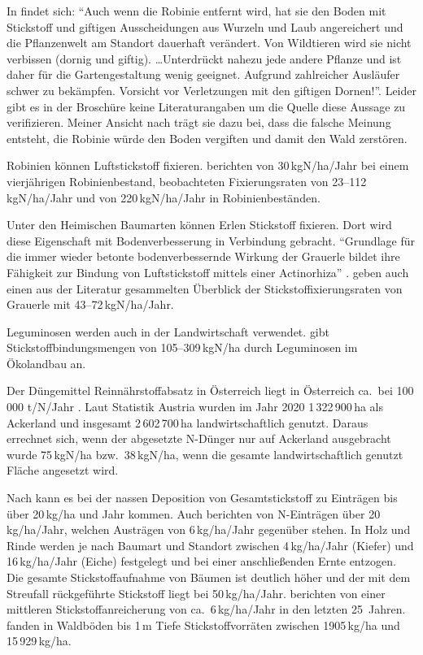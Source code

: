 \documentclass[twocolumn]{scrartcl}
\begin{document}
In \cite{oebf2019aliensAusDemGarten} findet sich: \enquote{Auch wenn die
Robinie entfernt wird, hat sie den Boden mit Stickstoff und giftigen
Ausscheidungen aus Wurzeln und Laub angereichert und die Pflanzenwelt
am Standort dauerhaft verändert. Von Wildtieren wird sie nicht
verbissen (dornig und giftig). \dots Unterdrückt nahezu jede andere
Pflanze und ist daher für die Gartengestaltung wenig
geeignet. Aufgrund zahlreicher Ausläufer schwer zu bekämpfen. Vorsicht
vor Verletzungen mit den giftigen Dornen!}. Leider gibt es in
der Broschüre keine Literaturangaben um die Quelle diese Aussage
zu verifizieren. Meiner Ansicht nach trägt sie dazu bei, dass die falsche
Meinung entsteht, die Robinie würde den Boden vergiften und damit den Wald zerstören.

Robinien können Luftstickstoff fixieren.
\cite{boring1984robinieN} berichten von 30\,kgN/ha/Jahr bei einem
vierjährigen Robinienbestand, \cite{noh2009robinieN} beobachteten
Fixierungsraten von 23--112\,kgN/ha/Jahr und \cite{danso1995robinieN}
von 220\,kgN/ha/Jahr in Robinienbeständen.

Unter den Heimischen Baumarten können Erlen Stickstoff fixieren. Dort
wird diese Eigenschaft mit Bodenverbesserung in Verbindung
gebracht. \enquote{Grundlage für die immer wieder betonte bodenverbessernde
Wirkung der Grauerle bildet ihre Fähigkeit zur Bindung von
Luftstickstoff mittels einer Actinorhiza}
\citep{schuett2014alnusIncarna}. \cite{schuett2014alnusIncarna} geben
auch einen aus der Literatur gesammelten Überblick der
Stickstoffixierungsraten von Grauerle mit 43--72\,kgN/ha/Jahr.

Leguminosen werden auch in der Landwirtschaft verwendet.
\cite{kolbe2008stickstoff} gibt Stickstoffbindungsmengen von
105--309\,kgN/ha durch Leguminosen im Ökolandbau an.

Der Düngemittel Reinnährstoffabsatz in Österreich liegt in Österreich
ca.\ bei 100\,000 t/N/Jahr \citep{ama2024duengemittel}. Laut Statistik
Austria wurden im Jahr 2020 1\,322\,900\,ha als Ackerland und
insgesamt 2\,602\,700\,ha landwirtschaftlich genutzt. Daraus errechnet
sich, wenn der abgesetzte N-Dünger nur auf Ackerland ausgebracht wurde
75\,kgN/ha bzw.\ 38\,kgN/ha, wenn die gesamte landwirtschaftlich
genutzt Fläche angesetzt wird.

Nach \cite{uba1998deposition} kann es bei der nassen Deposition von
Gesamtstickstoff zu Einträgen bis über 20\,kg/ha und Jahr kommen. Auch
\cite{raspe2018stickstoff} berichten von N-Einträgen über
20\,kg/ha/Jahr, welchen Austrägen von 6\,kg/ha/Jahr gegenüber
stehen. In Holz und Rinde werden je nach Baumart und Standort zwischen
4\,kg/ha/Jahr (Kiefer) und 16\,kg/ha/Jahr (Eiche) festgelegt und bei
einer anschließenden Ernte entzogen. Die gesamte Stickstoffaufnahme
von Bäumen ist deutlich höher und der mit dem Streufall rückgeführte
Stickstoff liegt bei 50\,kg/ha/Jahr. \cite{raspe2018stickstoff}
berichten von einer mittleren Stickstoffanreicherung von
ca.\ 6\,kg/ha/Jahr in den letzten 25~Jahren.
\cite{emberger1965stickstoff} fanden in Waldböden bis 1\,m Tiefe
Stickstoffvorräten zwischen 1905\,kg/ha und 15\,929\,kg/ha.
\end{document}
